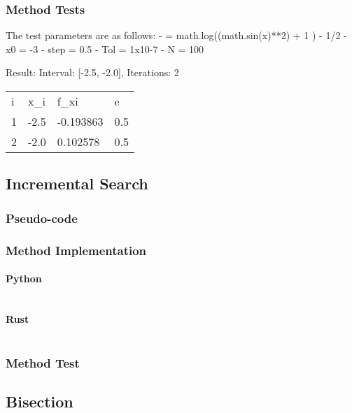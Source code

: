\documentclass{article}
\begin{document}
    \subsubsection{Method Tests}\label{subsec:method-tests}

    The test parameters are as follows:
        - \textflorin = math.log((math.sin(x)**2) + 1 ) - 1/2
        - x0 = -3
        - step = 0.5
        - Tol = 1x10-7
        - N = 100

    Result:
        Interval: [-2.5, -2.0], Iterations: 2

        \begin{table}[ht]
        \begin{tabular}{llll}
        i & x\_i & f\_xi     & e   \\
        1 & -2.5 & -0.193863 & 0.5 \\
        2 & -2.0 & 0.102578  & 0.5
        \end{tabular}\label{tab:table}
        \end{table}

    \subsection{Incremental Search}
        \subsubsection{Pseudo-code}
        \subsubsection{Method Implementation}
            \paragraph{Python}
                \begin{verbatim}
                \end{verbatim}
            \paragraph{Rust}
                \begin{verbatim}
                \end{verbatim}
        \subsubsection{Method Test}

    \subsection{Bisection}\label{subsec:bisection}
\end{document}
